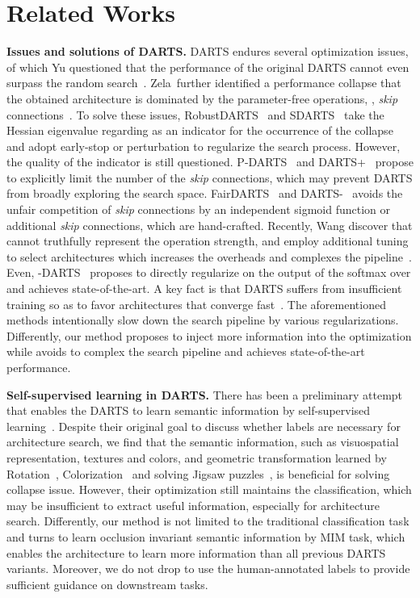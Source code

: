 \documentclass[10pt,twocolumn,letterpaper]{article}
\newcommand{\mypara}[1]{\vspace{1mm}\noindent\textbf{#1}}
\begin{document}
 \section{Related Works}
\label{sec:related}
\vspace{-4pt}
\mypara{Issues and solutions of DARTS.}
DARTS endures several optimization issues, of which Yu \etal questioned that the performance of the original DARTS cannot even surpass the random search~\cite{Yu2020Evaluating}.
Zela~\etal further identified a performance collapse that the obtained architecture is dominated by the parameter-free operations, \eg, \textit{skip} connections~\cite{Zela2020Understanding}.
To solve these issues, RobustDARTS~\cite{Zela2020Understanding} and SDARTS~\cite{chen_2020_sdarts} take the Hessian eigenvalue regarding  as an indicator for the occurrence of the collapse and adopt early-stop or perturbation to regularize the search process.
However, the quality of the indicator is still questioned.
P-DARTS~\cite{Chen_2019_pdarts} and DARTS+~\cite{liang2019darts+} propose to explicitly limit the number of the \textit{skip} connections, 
which may prevent DARTS from broadly exploring the search space.
FairDARTS~\cite{chu_2020_fairdarts} and DARTS-~\cite{chu2021dartsminus} avoids the unfair competition of \textit{skip} connections by an independent sigmoid function or additional \textit{skip} connections, which are hand-crafted.
Recently, Wang \etal discover that  cannot truthfully represent the operation strength,
and employ additional tuning to select architectures which increases the overheads and complexes the pipeline~\cite{wang_2021_rethinking}.
Even, -DARTS~\cite{ye_2022_beta} proposes to directly regularize on the output of the softmax over  and achieves state-of-the-art.
A key fact is that DARTS suffers from insufficient training so as to favor architectures that converge fast~\cite{shu_2020_understanding}.
The aforementioned methods intentionally slow down the search pipeline by various regularizations.
Differently, our method proposes to inject more information into the optimization 
while avoids to complex the search pipeline and achieves state-of-the-art performance.

\mypara{Self-supervised learning in DARTS.}
There has been a preliminary attempt that enables the DARTS to learn semantic information by self-supervised learning~\cite{liu_2020_unnas}.
Despite their original goal to discuss whether labels are necessary for architecture search, 
we find that the semantic information, such as visuospatial representation, textures and colors, and geometric transformation learned by Rotation~\cite{gidaris_2018_rotation}, Colorization~\cite{zhang_2016_col} and solving Jigsaw puzzles~\cite{noroozi_2016_jigsaw},
is beneficial for solving collapse issue.
However, 
their optimization still maintains the classification, which may be insufficient to extract useful information, especially for architecture search.
Differently, 
our method is not limited to the traditional classification task and turns to learn occlusion invariant semantic information by MIM task,
which enables the architecture to learn more information than all previous DARTS variants.
Moreover, we do not drop to use the human-annotated labels to provide sufficient guidance on downstream tasks.
\end{document}
